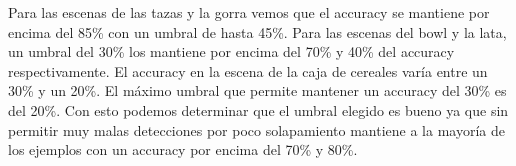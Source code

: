 Para las escenas de las tazas y la gorra vemos que el accuracy se mantiene por encima del 85\% con un umbral de hasta 45\%. Para las escenas del bowl y la lata, un umbral del 30\% los mantiene por encima del 70\% y 40\% del accuracy respectivamente. El accuracy en la escena de la caja de cereales varía entre un 30\% y un 20\%. El máximo umbral que permite mantener un accuracy del 30\% es del 20\%. Con esto podemos determinar que el umbral elegido es bueno ya que sin permitir muy malas detecciones por poco solapamiento mantiene a la mayoría de los ejemplos con un accuracy por encima del 70\% y 80\%.
